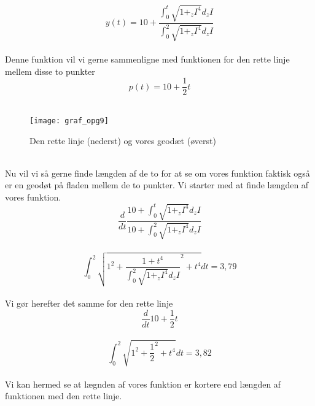 $$y(t)=10+ \frac{\int_{0}^{t}\sqrt{1+_zI^4}d_zI}{\int_{0}^{2}\sqrt{1+_zI^4}d_zI} $$ \\
Denne funktion vil vi gerne sammenligne med funktionen for den rette linje mellem disse to punkter \\
$$p(t)=10+ \frac{1}{2}t $$ \\
\begin{figure}
  \caption{Den rette linje (nederst) og vores geodæt (øverst)}
  \centering
    \texttt{[image: graf\_opg9]}
\end{figure} \\
Nu vil vi så gerne finde længden af de to for at se om vores funktion faktisk også er en geodøt på fladen mellem de to punkter. Vi starter med at finde længden af vores funktion. \\
$$ \frac{d}{dt} \frac{10+\int_{0}^{t}\sqrt{1+_zI^4}d_zI}{10+\int_{0}^{2}\sqrt{1+_zI^4}d_zI}$$ \\
$$ \int_{0}^{2}\sqrt{1^2+ \frac{1+t^4}{\int_{0}^{2}\sqrt{1+_zI^4}d_zI}^2+t^4}dt=3,79  $$\\
Vi gør herefter det samme for den rette linje \\
$$ \frac{d}{dt}10+ \frac{1}{2}t $$\\
$$\int_{0}^{2}\sqrt{1^2+\frac{1}{2}^2+t^4}dt=3,82 $$\\
Vi kan hermed se at lægnden af vores funktion er kortere end længden af funktionen med den rette linje.
